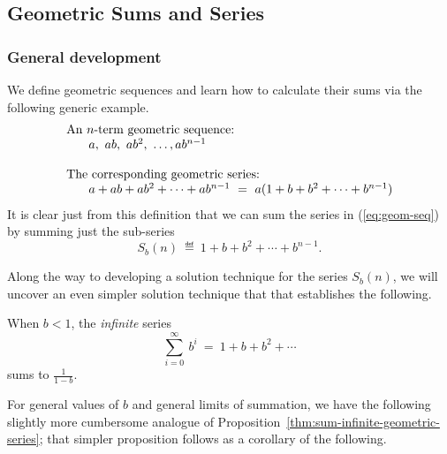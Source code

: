 
\subsection{Geometric Sums and Series}
\label{sec:geometric-sums}


\subsubsection{General development}
\label{sec:general-geometric}

We define geometric sequences and learn how to calculate their sums
via the following generic example.
\begin{equation}
\label{eq:geom-seq}
\begin{array}{l}
\mbox{An $n$-term geometric sequence:} \\
\hspace*{.25in}a, \ ab, \ ab^2, \ \ldots, ab^{n-1} \\
 \\
\mbox{The corresponding geometric series:} \\
\hspace*{.25in}a + ab + ab^2 + \cdots + ab^{n-1} \ = \
 a (1+ b + b^2 + \cdots + b^{n-1})
\end{array}
\end{equation}
It is clear just from this definition that we can sum the series in
(\ref{eq:geom-seq}) by summing just the sub-series
\begin{equation}
\label{eq:geom-series}
S_{b}(n) \ \eqdef \
1+ b + b^2 + \cdots + b^{n-1}.
\end{equation}

Along the way to developing a solution technique for the series
$S_{b}(n)$, we will uncover an even simpler solution
technique that that establishes the following.

\begin{prop}
\label{thm:sum-infinite-geometric-series}
When $b < 1$,  the {\em infinite} series
\[ \sum_{i=0}^\infty \ b^i \ = \ 1 + b + b^2 + \cdots \]
sums to $\displaystyle \frac{1}{1-b}$.
\end{prop}

\bigskip

For general values of $b$ and general limits of summation, we have the
following slightly more cumbersome analogue of
Proposition~\ref{thm:sum-infinite-geometric-series}; that simpler
proposition follows as a corollary of the following.


